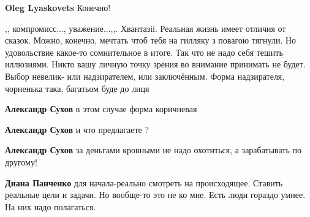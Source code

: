 \begin{itemize}
\begin{itemize}
\textbf{Oleg Lyaskovets} Конечно! \Smiley[1.0][yellow]
\end{itemize}

 

,, компромисс..., уважение...,,. Хвантазii. Реальная жизнь имеет отличия от
сказок. Можно, конечно, мечтать чтоб тебя на гилляку з повагою тягнули. Но
удовольствие какое-то сомнительное в итоге. Так что не надо себя тешить
иллюзиями. Никто вашу личную точку зрения во внимание принимать не будет. Выбор
невелик- или надзирателем, или заключённым. Форма надзирателя, чорненька така,
багатьом буде до лиця

\begin{itemize}
 
\textbf{Александр Сухов} в этом случае форма коричневая


 
\textbf{Александр Сухов} и что предлагаете ?

 
\textbf{Александр Сухов} за деньгами кровными не надо охотиться, а зарабатывать по другому!

 
\textbf{Диана Панченко} для начала-реально смотреть на происходящее. Ставить реальные цели и задачи. Но вообще-то это не ко мне. Есть люди гораздо умнее. На них надо полагаться.


\end{itemize}
\end{itemize}
